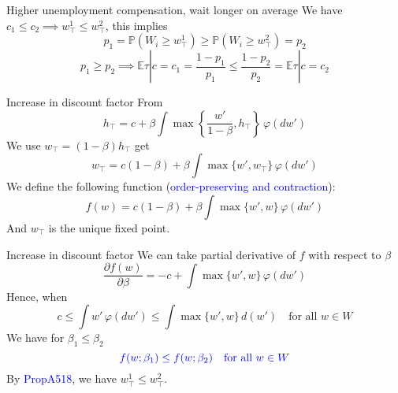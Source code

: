\begin{frame}{Higher unemployment compensation, wait longer on average}
    We have $c_1\le c_2\implies w_\top^1\le w_\top^2$, this implies
    $$
    p_1 = \mathbb{P}(W_i\ge w^1_\top)\ge \mathbb{P}(W_i\ge w_\top^2) = p_2
    $$
    $$
    p_1\ge p_2\implies\mathbb{E}\tau|c=c_1 = \frac{1-p_1}{p_1} \le  \frac{1-p_2}{p_2} = \mathbb{E}\tau|c=c_2
    $$
\end{frame}

\begin{frame}{Increase in discount factor}
From 
$$
h_\top = c+\beta\int\max\left\{\frac{w'}{1-\beta}, h_\top\right\}\, \varphi(dw')
$$
We use $w_\top = (1-\beta)h_\top$ get
$$
w_\top  = c(1-\beta)  + \beta\int\max\{w', w_\top\}\,\varphi(dw')
$$
We define the following function (\textcolor{blue}{order-preserving and contraction}):
$$
f(w) =  c(1-\beta)  + \beta\int\max\{w', w\}\,\varphi(dw')
$$
And $w_\top$ is the unique fixed point. 
\end{frame}

\begin{frame}{Increase in discount factor}
We can take partial derivative of $f$ with respect to $\beta$
$$
\frac{\partial f(w)}{\partial \beta} = -c+\int\max\{w',w\}\,\varphi(dw')
$$
Hence, when 
$$
c\le \int w'\,\varphi(dw') \le \int\max\{w',w\}\,d(w')\quad \text{for all $w\in W$}
$$
We have for $\beta_1\le\beta_2$
$$
\textcolor{blue}{f(w;\beta_1)\le f(w;\beta_2)\quad \text{for all $w\in W$}}
$$
By \textcolor{blue}{PropA518}, we have $w_\top^1\le w_\top^2$.
\end{frame}



